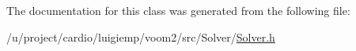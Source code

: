 The documentation for this class was generated from the following file:\begin{DoxyCompactItemize}
\item 
/u/project/cardio/luigiemp/voom2/src/Solver/\hyperlink{_solver_8h}{Solver.h}\end{DoxyCompactItemize}

